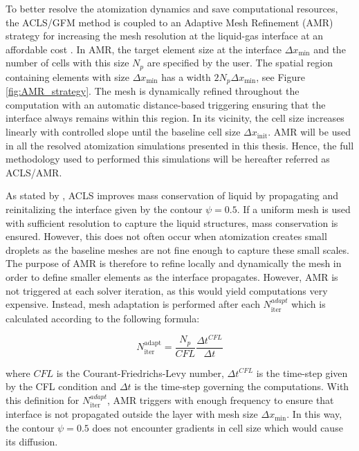 To better resolve the atomization dynamics and save computational resources, the ACLS/GFM method is coupled to an Adaptive Mesh Refinement (AMR) strategy for increasing the mesh resolution at the liquid-gas interface at an affordable cost . In AMR, the target element size at the interface $\Delta x_\mathrm{min}$ and  the number of cells with this size $N_p$ are specified by the user. The spatial region containing elements with size $\Delta x_\mathrm{min}$ has a width $2 N_p\Delta x_\mathrm{min}$, see Figure \ref{fig:AMR_strategy}. The mesh is dynamically refined throughout the computation with an automatic distance-based triggering ensuring that the interface always remains within this region. In its vicinity, the cell size increases linearly with controlled slope until the baseline cell size $\Delta x_\mathrm{init}$. AMR will be used in all the resolved atomization simulations presented in this thesis. Hence, the full methodology used to performed this simulations will be hereafter referred as ACLS/AMR.

As stated by , ACLS improves mass conservation of liquid by propagating and reinitalizing the interface given by the contour $\psi = 0.5$. If a uniform mesh is used with sufficient resolution to capture the liquid structures, mass conservation is ensured. However, this does not often occur when atomization creates small droplets as the baseline meshes are not fine enough to capture these small scales. The purpose of AMR is therefore to refine locally and dynamically the mesh in order to define smaller elements as the interface propagates. However, AMR is not triggered at each solver iteration, as this would yield computations very expensive. Instead, mesh adaptation is performed after each $N_\mathrm{iter}^{adapt}$ which is calculated according to the following formula:

\begin{equation}
\label{eq:ch2_N_iter_adapt_AMR}
N_\mathrm{iter}^\mathrm{adapt} = \frac{N_p}{CFL} \frac{\Delta t^{CFL}}{\Delta t}
\end{equation}

where $CFL$ is the Courant-Friedrichs-Levy number, $\Delta t^{CFL}$ is the time-step given by the CFL condition and $\Delta t$ is the time-step governing the computations.  With this definition for $N_\mathrm{iter}^{adapt}$, AMR triggers with enough frequency to ensure that interface is not propagated outside the layer with mesh size $\Delta x_\mathrm{min}$. In this way, the contour $\psi = 0.5$ does not encounter gradients in cell size which would cause its diffusion.

